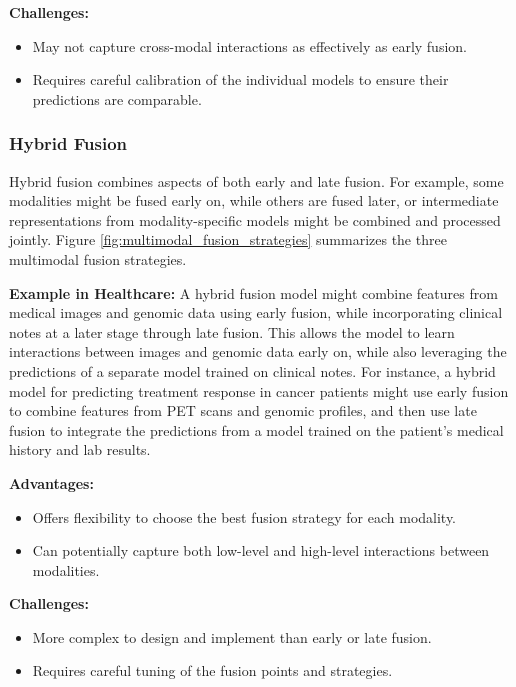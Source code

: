 \documentclass[pdflatex,sn-mathphys-num]{sn-jnl}%
\theoremstyle{thmstyleone}%
\theoremstyle{thmstyletwo}%
\theoremstyle{thmstylethree}%
\begin{document}
\begin{itemize}
        \textbf{Challenges:}
        \begin{itemize}
            \item May not capture cross-modal interactions as effectively as early fusion.
            \item Requires careful calibration of the individual models to ensure their predictions are comparable.
        \end{itemize}

        \subsubsection{Hybrid Fusion} 
        Hybrid fusion combines aspects of both early and late fusion. For example, some modalities might be fused early on, while others are fused later, or intermediate representations from modality-specific models might be combined and processed jointly. Figure \ref{fig:multimodal_fusion_strategies} summarizes the three multimodal fusion strategies.
        
        \textbf{Example in Healthcare:} A hybrid fusion model might combine features from medical images and genomic data using early fusion, while incorporating clinical notes at a later stage through late fusion. This allows the model to learn interactions between images and genomic data early on, while also leveraging the predictions of a separate model trained on clinical notes. For instance, a hybrid model for predicting treatment response in cancer patients might use early fusion to combine features from PET scans and genomic profiles, and then use late fusion to integrate the predictions from a model trained on the patient's medical history and lab results.

        \textbf{Advantages:}
        \begin{itemize}
            \item Offers flexibility to choose the best fusion strategy for each modality.
            \item Can potentially capture both low-level and high-level interactions between modalities.
        \end{itemize}

        \textbf{Challenges:}
        \begin{itemize}
            \item More complex to design and implement than early or late fusion.
            \item Requires careful tuning of the fusion points and strategies.
        \end{itemize}
    

\end{itemize}
\end{document}
